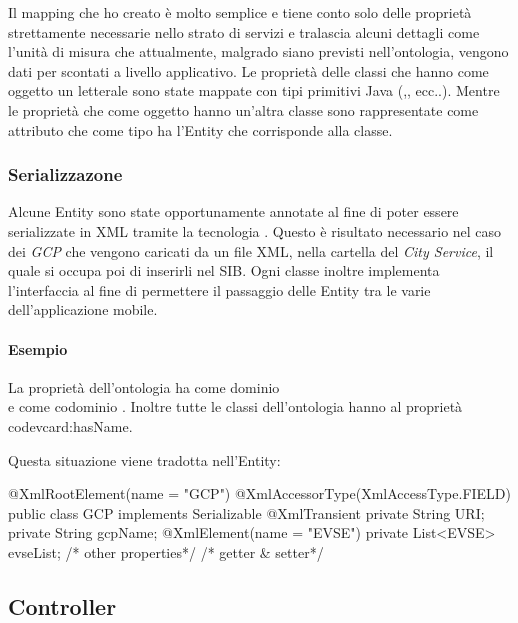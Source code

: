 Il mapping che ho creato è molto semplice e tiene conto solo delle proprietà strettamente necessarie nello strato di servizi e tralascia alcuni dettagli come l'unità di misura che attualmente, malgrado siano previsti nell'ontologia, vengono dati per scontati a livello applicativo.
Le proprietà delle classi che hanno come oggetto un letterale sono state mappate con tipi primitivi Java (,, ecc..). Mentre le proprietà che come oggetto hanno un'altra classe sono rappresentate come attributo che come tipo ha l'Entity
che corrisponde alla classe. 

\subsubsection{Serializzazone} 

Alcune Entity sono state opportunamente annotate al fine di poter essere serializzate in XML tramite la tecnologia . Questo è risultato necessario nel caso dei \emph{GCP} che vengono caricati da un file XML, nella cartella del \emph{City Service}, il quale si occupa poi di inserirli nel SIB. Ogni classe inoltre implementa l'interfaccia  al fine di permettere il passaggio delle Entity tra le varie  dell'applicazione mobile.

\paragraph{Esempio}

La proprietà dell'ontologia  ha come dominio \\  e come codominio . Inoltre tutte le classi dell'ontologia hanno al proprietà code{vcard:hasName}.

Questa situazione viene tradotta nell'Entity:

\begin{java}[caption={Entity di esempio},label=lst:entity]
@XmlRootElement(name = "GCP")
@XmlAccessorType(XmlAccessType.FIELD)
public class GCP implements Serializable {
	@XmlTransient
	private String URI;
	private String gcpName;
	@XmlElement(name = "EVSE")
	private List<EVSE> evseList;
	/* other properties*/
	/* getter & setter*/	
}
\end{java}

\subsection{Controller}

